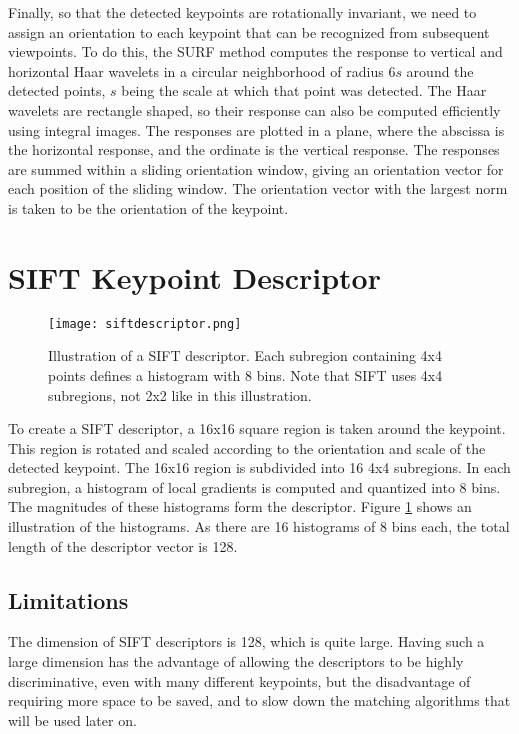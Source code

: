 Finally, so that the detected keypoints are rotationally invariant, we need to assign an orientation to each keypoint that can be recognized from subsequent viewpoints. To do this, the SURF method computes the response to vertical and horizontal Haar wavelets in a circular neighborhood of radius $6s$ around the detected points, $s$ being the scale at which that point was detected. The Haar wavelets are rectangle shaped, so their response can also be computed efficiently using integral images. The responses are plotted in a plane, where the abscissa is the horizontal response, and the ordinate is the vertical response. The responses are summed within a sliding orientation window, giving an orientation vector for each position of the sliding window. The orientation vector with the largest norm is taken to be the orientation of the keypoint.
\cite{surf}

\section{SIFT Keypoint Descriptor}
\begin{figure}[H]
  \centering
  \texttt{[image: siftdescriptor.png]}
    \caption{Illustration of a SIFT descriptor. Each subregion containing 4x4 points defines a histogram with 8 bins. Note that SIFT uses 4x4 subregions, not 2x2 like in this illustration. \cite{sift2}}
    \label{fig:siftdescriptor}
\end{figure}
To create a SIFT descriptor, a 16x16 square region is taken around the keypoint. This region is rotated and scaled according to the orientation and scale of the detected keypoint. The 16x16 region is subdivided into 16 4x4 subregions. In each subregion, a histogram of local gradients is computed and quantized into 8 bins. The magnitudes of these histograms form the descriptor. Figure \ref{fig:siftdescriptor} shows an illustration of the histograms. As there are 16 histograms of 8 bins each, the total length of the descriptor vector is 128. \cite{sift}

\subsection{Limitations}
The dimension of SIFT descriptors is 128, which is quite large. Having such a large dimension has the advantage of allowing the descriptors to be highly discriminative, even with many different keypoints, but the disadvantage of requiring more space to be saved, and to slow down the matching algorithms that will be used later on.\\

